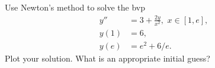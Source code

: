 \begin{problem}
Use Newton's method to solve the bvp
\begin{equation*}
\begin{split}
y'' &= 3 + \frac{2y}{x^2}, \,\, x \in [1,e],\\
y(1) &= 6, \\
y(e) &= e^2 + 6/e.
\end{split}
\end{equation*}
Plot your solution. What is an appropriate initial guess? 
\end{problem}












% 
% 
% 
% 
% 
% 
% 
